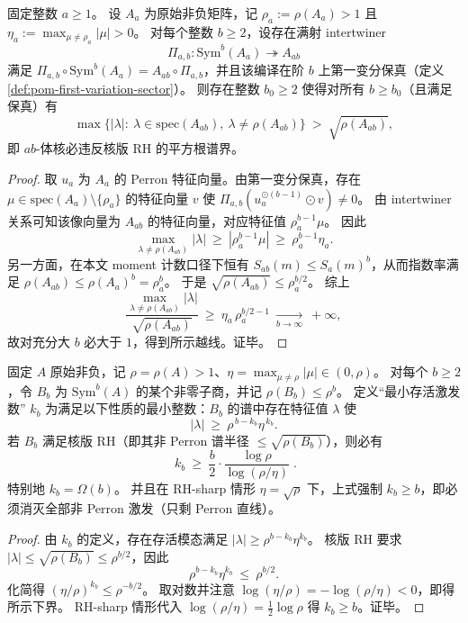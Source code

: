 \begin{theorem}[第一变分保真 \texorpdfstring{$\Rightarrow$}{=>} 高阶核版 RH 不可能：MOM 乘法升级的致命放大]\label{thm:pom-first-variation-fidelity-rh-breaking}
固定整数 \(a\ge 1\)。
设 \(A_a\) 为原始非负矩阵，记 \(\rho_a:=\rho(A_a)>1\) 且 \(\eta_a:=\max_{\mu\ne\rho_a}|\mu|>0\)。
对每个整数 \(b\ge 2\)，设存在满射 intertwiner
\[
\Pi_{a,b}:\mathrm{Sym}^b(A_a)\twoheadrightarrow A_{ab}
\]
满足 \(\Pi_{a,b}\circ \mathrm{Sym}^b(A_a)=A_{ab}\circ \Pi_{a,b}\)，并且该编译在阶 \(b\) 上第一变分保真（定义 \ref{def:pom-first-variation-sector}）。
则存在整数 \(b_0\ge 2\) 使得对所有 \(b\ge b_0\)（且满足保真）有
\[
\max\bigl\{|\lambda|:\ \lambda\in\mathrm{spec}(A_{ab}),\ \lambda\ne\rho(A_{ab})\bigr\}\ >\ \sqrt{\rho(A_{ab})},
\]
即 \(ab\)-体核必违反核版 RH 的平方根谱界。
\end{theorem}
\begin{proof}
取 \(u_a\) 为 \(A_a\) 的 Perron 特征向量。由第一变分保真，存在 \(\mu\in\mathrm{spec}(A_a)\setminus\{\rho_a\}\) 的特征向量 \(v\) 使
\(\Pi_{a,b}(u_a^{\odot(b-1)}\odot v)\ne 0\)。
由 intertwiner 关系可知该像向量为 \(A_{ab}\) 的特征向量，对应特征值 \(\rho_a^{b-1}\mu\)。
因此
\[
\max_{\lambda\ne\rho(A_{ab})}|\lambda|
\ \ge\
|\rho_a^{b-1}\mu|
\ \ge\
\rho_a^{b-1}\eta_a.
\]
另一方面，在本文 moment 计数口径下恒有 \(S_{ab}(m)\le S_a(m)^b\)，从而指数率满足
\(\rho(A_{ab})\le \rho(A_a)^b=\rho_a^b\)。
于是
\(
\sqrt{\rho(A_{ab})}\le \rho_a^{b/2}
\)。
综上
\[
\frac{\max_{\lambda\ne\rho(A_{ab})}|\lambda|}{\sqrt{\rho(A_{ab})}}
\ \ge\
\eta_a\,\rho_a^{b/2-1}\ \xrightarrow[b\to\infty]{}\ +\infty,
\]
故对充分大 \(b\) 必大于 \(1\)，得到所示越线。证毕。
\end{proof}

\begin{theorem}\label{thm:pom-excitation-filter-linear-bound}
固定 \(A\) 原始非负，记 \(\rho=\rho(A)>1\)、\(\eta=\max_{\mu\ne\rho}|\mu|\in(0,\rho)\)。
对每个 \(b\ge 2\)，令 \(B_b\) 为 \(\mathrm{Sym}^b(A)\) 的某个非零子商，并记 \(\rho(B_b)\le \rho^b\)。
定义“最小存活激发数” \(k_b\) 为满足以下性质的最小整数：\(B_b\) 的谱中存在特征值 \(\lambda\) 使
\[
|\lambda|\ \ge\ \rho^{\,b-k_b}\eta^{\,k_b}.
\]
若 \(B_b\) 满足核版 RH（即其非 Perron 谱半径 \(\le \sqrt{\rho(B_b)}\)），则必有
\[
\boxed{\;
k_b\ \ge\ \frac{b}{2}\cdot \frac{\log\rho}{\log(\rho/\eta)}\; }.
\]
特别地 \(k_b=\Omega(b)\)。
并且在 RH-sharp 情形 \(\eta=\sqrt{\rho}\) 下，上式强制 \(k_b\ge b\)，即必须消灭全部非 Perron 激发（只剩 Perron 直线）。
\end{theorem}
\begin{proof}
由 \(k_b\) 的定义，存在存活模态满足 \(|\lambda|\ge \rho^{b-k_b}\eta^{k_b}\)。
核版 RH 要求 \(|\lambda|\le \sqrt{\rho(B_b)}\le \rho^{b/2}\)，因此
\[
\rho^{b-k_b}\eta^{k_b}\ \le\ \rho^{b/2}.
\]
化简得 \((\eta/\rho)^{k_b}\le \rho^{-b/2}\)。
取对数并注意 \(\log(\eta/\rho)=-\log(\rho/\eta)<0\)，即得所示下界。
RH-sharp 情形代入 \(\log(\rho/\eta)=\tfrac12\log\rho\) 得 \(k_b\ge b\)。证毕。
\end{proof}

